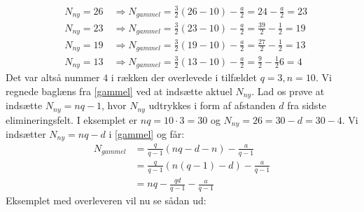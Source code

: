 \begin{align*}
&N_{ny}=26 \quad \Rightarrow N_{gammel}=\frac{3}{2}(26-10)-\frac{a}{2}=24-\frac{a}{2}=23\\
&N_{ny}=23 \quad \Rightarrow N_{gammel}=\frac{3}{2}(23-10)-\frac{a}{2}=\frac{39}{2}-\frac{1}{2}=19\\
&N_{ny}=19 \quad \Rightarrow N_{gammel}=\frac{3}{2}(19-10)-\frac{a}{2}=\frac{27}{2}-\frac{1}{2}=13\\
&N_{ny}=13 \quad \Rightarrow N_{gammel}=\frac{3}{2}(13-10)-\frac{a}{2}=\frac{9}{2}-\frac{1}{2}6=4
\end{align*}
Det var altså nummer \(4\) i rækken der overlevede i tilfældet \(q=3, n=10\).
Vi regnede baglæns fra \ref{gammel} ved at indsætte aktuel \(N_{ny}\). Lad os prøve at indsætte \(N_{ny}=nq-1\), hvor \(N_{ny}\) udtrykkes i form af afstanden \(d\) fra sidste elimineringsfelt. I eksemplet er \(nq=10 \cdot 3 =30\) og \(N_{ny}=26=30-d=30-4\). Vi indsætter \(N_{ny}=nq-d\) i \ref{gammel} og får:
\begin{align}
N_{gammel}&=\frac{q}{q-1}(nq-d-n)-\frac{a}{q-1}\\
&=\frac{q}{q-1}(n(q-1)-d)-\frac{a}{q-1}\\
&=nq-\frac{qd}{q-1}-\frac{a}{q-1}
\end{align}
Eksemplet med overleveren vil nu se sådan ud:

